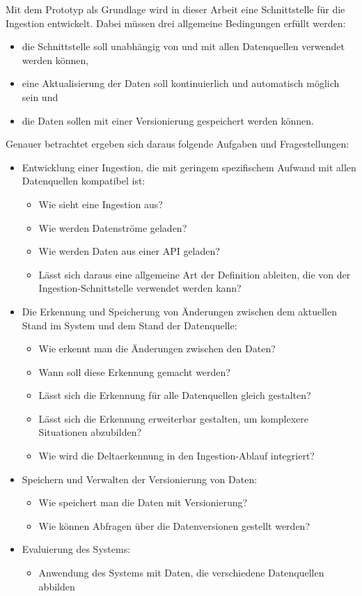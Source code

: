 Mit dem Prototyp als Grundlage wird in dieser Arbeit eine Schnittstelle für die Ingestion entwickelt.
Dabei müssen drei allgemeine Bedingungen erfüllt werden: \begin{itemize}
    \item die Schnittstelle soll unabhängig von und mit allen Datenquellen verwendet werden können,
    \item eine Aktualisierung der Daten soll kontinuierlich und automatisch möglich sein und
    \item die Daten sollen mit einer Versionierung gespeichert werden können.
\end{itemize}
Genauer betrachtet ergeben sich daraus folgende Aufgaben und Fragestellungen: \begin{itemize}
    \item Entwicklung einer Ingestion, die mit geringem spezifischem Aufwand mit allen Datenquellen kompatibel ist: \begin{itemize}
        \item Wie sieht eine Ingestion aus?
        \item Wie werden Datenströme geladen?
        \item Wie werden Daten aus einer API geladen?
        \item Lässt sich daraus eine allgemeine Art der Definition ableiten, die von der Ingestion-Schnittstelle verwendet werden kann?
    \end{itemize}
    \item Die Erkennung und Speicherung von Änderungen zwischen dem aktuellen Stand im System und dem Stand der Datenquelle: \begin{itemize}
        \item Wie erkennt man  die Änderungen zwischen den Daten?
        \item Wann soll diese Erkennung gemacht werden?
        \item Lässt sich die Erkennung für alle Datenquellen gleich gestalten?
        \item Lässt sich die Erkennung erweiterbar gestalten, um komplexere Situationen abzubilden?
        \item Wie wird die Deltaerkennung in den Ingestion-Ablauf integriert?
    \end{itemize}
    \item Speichern und Verwalten der Versionierung von Daten: \begin{itemize}
        \item Wie speichert man die Daten mit Versionierung?
        \item Wie können Abfragen über die Datenversionen gestellt werden?
    \end{itemize}
    \item Evaluierung des Systems: \begin{itemize}
        \item Anwendung des Systems mit Daten, die verschiedene Datenquellen abbilden
    \end{itemize}
\end{itemize}

